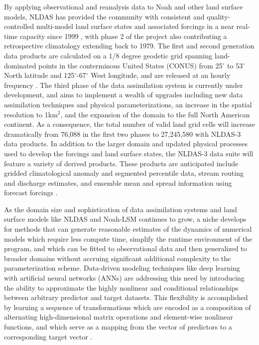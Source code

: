 By applying observational and reanalysis data to Noah and other land surface models, NLDAS has provided the community with consistent and quality-controlled multi-model land surface states and associated forcings in a near real-time capacity since 1999 \citep{cosgrove_real-time_2003}, with phase 2 of the project also contributing a retrospective climatology extending back to 1979. The first and second generation data products are calculated on a 1/8 degree geodetic grid spanning land-dominated points in the conterminous United States (CONUS) from 25$^\circ$ to 53$^\circ$ North latitude and 125$^\circ$-67$^\circ$ West longitude, and are released at an hourly frequency  \citep{mitchell_multi-institution_2004} \citep{xia_continental-scale_2012}. The third phase of the data assimilation system is currently under development, and aims to implement a wealth of upgrades including new data assimilation techniques and physical parameterizations, an increase in the spatial resolution to 1km$^2$, and the expansion of the domain to the full North American continent. As a consequence, the total number of valid land grid cells will increase dramatically from 76,088 in the first two phases to 27,245,580 with NLDAS-3 data products. In addition to the larger domain and updated physical processes used to develop the forcings and land surface states, the NLDAS-3 data suite will feature a variety of derived products. These products are anticipated include gridded climatological anomaly and segmented percentile data, stream routing and discharge estimates, and ensemble mean and spread information using forecast forcings \citep{kumar_north_2024}.

As the domain size and sophistication of data assimilation systems and land surface models like NLDAS and Noah-LSM continues to grow, a niche develops for methods that can generate reasonable estimates of the dynamics of numerical models which require less compute time, simplify the runtime environment of the program, and which can be fitted to observational data and then generalized to broader domains without accruing significant additional complexity to the parameterization scheme.  Data-driven modeling techniques like deep learning with artificial neural networks (ANNs) are addressing this need by introducing the ability to approximate the highly nonlinear and conditional relationships between arbitrary predictor and target datasets. This flexibility is accomplished by learning a sequence of transformations which are encoded as a composition of alternating high-dimensional matrix operations and element-wise nonlinear functions, and which serve as a mapping from the vector of predictors to a corresponding target vector \citep{hornik_multilayer_1989}.

